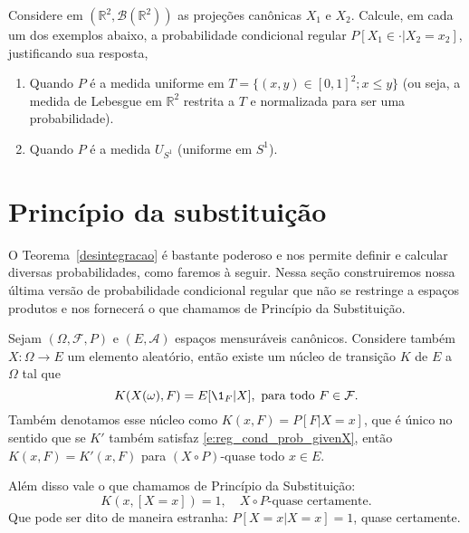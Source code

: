 \documentclass[../Notas_de_aula.tex]{subfiles}
\begin{document}
\begin{exercise}
  Considere em $(\mathbb{R}^2, \mathcal{B}(\mathbb{R}^2))$ as projeções canônicas $X_1$ e $X_2$.
  Calcule, em cada um dos exemplos abaixo, a probabilidade condicional regular $P[X_1 \in \cdot|X_2 = x_2]$, justificando sua resposta,
  \begin{enumerate}[\quad a)]
  \item Quando $P$ é a medida uniforme em $T = \{(x,y) \in [0,1]^2; x \leq y\}$ (ou seja, a medida de Lebesgue em $\mathbb{R}^2$ restrita a $T$ e normalizada para ser uma probabilidade).
  \item Quando $P$ é a medida $U_{S^1}$ (uniforme em $S^1$).
  \end{enumerate}
\end{exercise}

\section{Princípio da substituição}

O Teorema~\ref{desintegracao} é bastante poderoso e nos permite definir e calcular diversas probabilidades, como faremos à seguir.
Nessa seção construiremos nossa última versão de probabilidade condicional regular que não se restringe a espaços produtos e nos fornecerá o que chamamos de Princípio da Substituição. 

\begin{theorem}
  \label{t:princ_substit}
  Sejam $(\Omega, \mathcal{F}, P)$ e $(E, \mathcal{A})$ espaços mensuráveis canônicos.
  Considere também $X: \Omega \to E$ um elemento aleatório, então existe um núcleo de transição $K$ de $E$ a $\Omega$ tal que
  \begin{equation}
    \label{e:reg_cond_prob_givenX}
    K(X(\omega), F) = E[\1_{F} | X], \text{ para todo $F \in \mathcal{F}$}.
  \end{equation}
  Também denotamos esse núcleo como $K(x, F) = P[F | X = x]$, que é único no sentido que se $K'$ também satisfaz \eqref{e:reg_cond_prob_givenX}, então $K(x, F) = K'(x, F)$ para $(X \circ P)$-quase todo $x \in E$.

  Além disso vale o que chamamos de Princípio da Substituição:
  \begin{equation}
    \label{e:princ_substit}
    K(x, [X = x]) = 1, \quad \text{$X \circ P$-quase certamente}.
  \end{equation}
  Que pode ser dito de maneira estranha: $P[X = x|X = x] = 1$, quase certamente.
\end{theorem}
\end{document}
